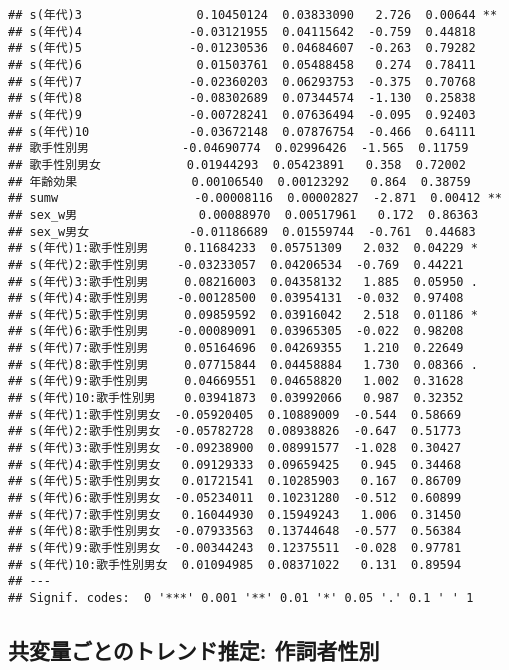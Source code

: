 \documentclass[
]{article}
\begin{document}
\begin{verbatim}
## s(年代)3                0.10450124  0.03833090   2.726  0.00644 **
## s(年代)4               -0.03121955  0.04115642  -0.759  0.44818   
## s(年代)5               -0.01230536  0.04684607  -0.263  0.79282   
## s(年代)6                0.01503761  0.05488458   0.274  0.78411   
## s(年代)7               -0.02360203  0.06293753  -0.375  0.70768   
## s(年代)8               -0.08302689  0.07344574  -1.130  0.25838   
## s(年代)9               -0.00728241  0.07636494  -0.095  0.92403   
## s(年代)10              -0.03672148  0.07876754  -0.466  0.64111   
## 歌手性別男             -0.04690774  0.02996426  -1.565  0.11759   
## 歌手性別男女            0.01944293  0.05423891   0.358  0.72002   
## 年齢効果                0.00106540  0.00123292   0.864  0.38759   
## sumw                   -0.00008116  0.00002827  -2.871  0.00412 **
## sex_w男                 0.00088970  0.00517961   0.172  0.86363   
## sex_w男女              -0.01186689  0.01559744  -0.761  0.44683   
## s(年代)1:歌手性別男     0.11684233  0.05751309   2.032  0.04229 * 
## s(年代)2:歌手性別男    -0.03233057  0.04206534  -0.769  0.44221   
## s(年代)3:歌手性別男     0.08216003  0.04358132   1.885  0.05950 . 
## s(年代)4:歌手性別男    -0.00128500  0.03954131  -0.032  0.97408   
## s(年代)5:歌手性別男     0.09859592  0.03916042   2.518  0.01186 * 
## s(年代)6:歌手性別男    -0.00089091  0.03965305  -0.022  0.98208   
## s(年代)7:歌手性別男     0.05164696  0.04269355   1.210  0.22649   
## s(年代)8:歌手性別男     0.07715844  0.04458884   1.730  0.08366 . 
## s(年代)9:歌手性別男     0.04669551  0.04658820   1.002  0.31628   
## s(年代)10:歌手性別男    0.03941873  0.03992066   0.987  0.32352   
## s(年代)1:歌手性別男女  -0.05920405  0.10889009  -0.544  0.58669   
## s(年代)2:歌手性別男女  -0.05782728  0.08938826  -0.647  0.51773   
## s(年代)3:歌手性別男女  -0.09238900  0.08991577  -1.028  0.30427   
## s(年代)4:歌手性別男女   0.09129333  0.09659425   0.945  0.34468   
## s(年代)5:歌手性別男女   0.01721541  0.10285903   0.167  0.86709   
## s(年代)6:歌手性別男女  -0.05234011  0.10231280  -0.512  0.60899   
## s(年代)7:歌手性別男女   0.16044930  0.15949243   1.006  0.31450   
## s(年代)8:歌手性別男女  -0.07933563  0.13744648  -0.577  0.56384   
## s(年代)9:歌手性別男女  -0.00344243  0.12375511  -0.028  0.97781   
## s(年代)10:歌手性別男女  0.01094985  0.08371022   0.131  0.89594   
## ---
## Signif. codes:  0 '***' 0.001 '**' 0.01 '*' 0.05 '.' 0.1 ' ' 1
\end{verbatim}

\hypertarget{ux5171ux5909ux91cfux3054ux3068ux306eux30c8ux30ecux30f3ux30c9ux63a8ux5b9a-ux4f5cux8a5eux8005ux6027ux5225}{%
\subsection{共変量ごとのトレンド推定:
作詞者性別}\label{ux5171ux5909ux91cfux3054ux3068ux306eux30c8ux30ecux30f3ux30c9ux63a8ux5b9a-ux4f5cux8a5eux8005ux6027ux5225}}
\end{document}
